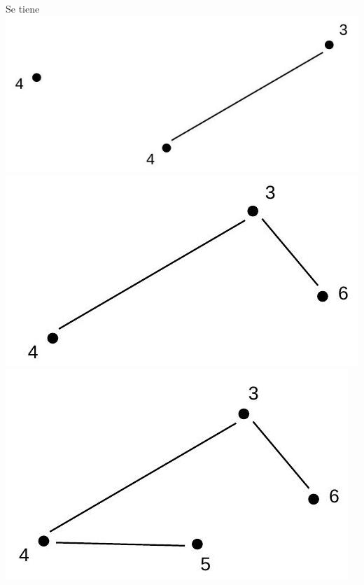 \documentclass[10pt]{article}
\begin{document}
Se tiene\\
\includegraphics[max width=\textwidth, center]{2025_09_05_93c7c1835f249f70c0eeg-26(4)}\\
\includegraphics[max width=\textwidth, center]{2025_09_05_93c7c1835f249f70c0eeg-26(1)}\\
\includegraphics[max width=\textwidth, center]{2025_09_05_93c7c1835f249f70c0eeg-26(2)}\\
\end{document}
